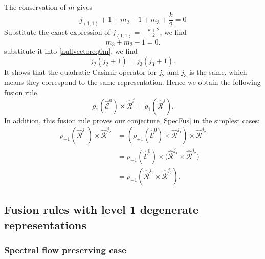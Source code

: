 \documentclass[10pt,a4paper]{article}
\numberwithin{equation}{section}
\newcommand{\vev}[1]{\left\langle #1 \right\rangle}
\begin{document}
The conservation of $m$ gives 
\begin{equation}
    j_{\vev{1,1}} +1 + m_{2} - 1 + m_{3} + \frac{k}{2} = 0
\end{equation}
Substitute the exact expression of $j_{\vev{1,1}} = -\frac{k+2}{2}$, we find 
\begin{equation}
    m_{3} + m_{2} -1 = 0.
\end{equation}
substitute it into \eqref{nullvectoreq0m}, we find 
\begin{equation}
    j_{2}(j_{2} + 1) = j_{3}(j_{3}+1).
\end{equation}
It shows that the quadratic Casimir operator for $j_{2}$ and $j_{3}$ is the same, which means they correspond to the same representation.
Hence we obtain the following fusion rule.
\begin{equation}
    \rho_{1} \left(\widehat{\mathcal{E}}^{0}\right) \times \widehat{\mathcal{R}}^{j} = \rho_{1} \left( \widehat{\mathcal{R}}^{j} \right).
\end{equation}
In addition, this fusion rule proves our conjecture \eqref{SpecFus} in the simplest cases: 
\begin{equation}
    \begin{aligned}
        \rho_{\pm 1} \left( \widehat{\mathcal{R}}^{j_{1}} \right) \times \widehat{\mathcal{R}}^{j_{2}} & = 
        \left(\rho_{\pm 1} \left(\widehat{\mathcal{E}}^{0}\right) \times \widehat{\mathcal{R}}^{j_{1}} \right) \times \widehat{\mathcal{R}}^{j_{2}} \\
        &= \rho_{\pm 1} \left(\widehat{\mathcal{E}}^{0}\right) \times \Big(\widehat{\mathcal{R}}^{j_{1}} \times \widehat{\mathcal{R}}^{j_{2}} \Big) \\
        &= \rho_{\pm 1} \left( \widehat{\mathcal{R}}^{j_{1}} \times \widehat{\mathcal{R}}^{j_{2}} \right).
    \end{aligned}
\end{equation}

\subsection{Fusion rules with level 1 degenerate representations}

\subsubsection*{Spectral flow preserving case}
\end{document}
